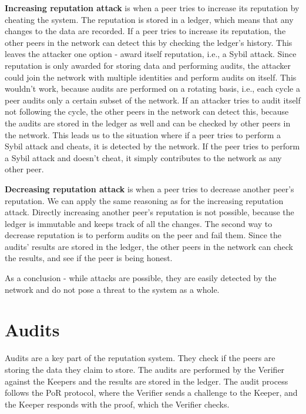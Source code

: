 \textbf{Increasing reputation attack} is when a peer tries to increase its reputation by
cheating the system.
The reputation is stored in a ledger, which means that any changes to the data are recorded.
If a peer tries to increase its reputation, the other peers in the network can detect this by
checking the ledger's history.
This leaves the attacker one option - award itself reputation, i.e., a Sybil attack.
Since reputation is only awarded for storing data and performing audits, the attacker could join the network
with multiple identities and perform audits on itself.
This wouldn't work, because audits are performed on a rotating basis, i.e., each cycle a peer audits only a 
certain subset of the network.
If an attacker tries to audit itself not following the cycle, the other peers in the network can detect this,
because the audits are stored in the ledger as well and can be checked by other peers in the network.
This leads us to the situation where if a peer tries to perform a Sybil attack and cheats, it is detected by
the network.
If the peer tries to perform a Sybil attack and doesn't cheat,
it simply contributes to the network as any other peer.

\textbf{Decreasing reputation attack} is when a peer tries to decrease another peer's reputation.
We can apply the same reasoning as for the increasing reputation attack.
Directly increasing another peer's reputation is not possible, because the ledger is immutable and keeps track of
all the changes.
The second way to decrease reputation is to perform audits on the peer and fail them.
Since the audits' results are stored in the ledger, the other peers in the network can check the results,
and see if the peer is being honest.

As a conclusion - while attacks are possible, they are easily detected by the network
and do not pose a threat to the system as a whole.

\section{Audits}

Audits are a key part of the reputation system.
They check if the peers are storing the data they claim to store.
The audits are performed by the Verifier against the Keepers and the results are stored in the ledger.
The audit process follows the PoR protocol, where the Verifier sends a challenge to the Keeper,
and the Keeper responds with the proof, which the Verifier checks.

